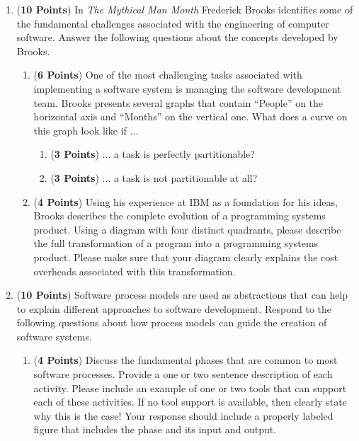\documentclass[12pt,epsf,psfig,graphics]{article}
\begin{document}
\begin{enumerate}
  
\item ({\bf 10 Points}) In {\em The Mythical Man Month} Frederick
  Brooks identifies some of the fundamental challenges associated with
  the engineering of computer software.  Answer the following
  questions about the concepts developed by Brooks.

  \begin{enumerate}
          
  \item ({\bf 6 Points}) One of the most challenging tasks associated
    with implementing a software system is managing the software
    development team.  Brooks presents several graphs that contain
    ``People'' on the horizontal axis and ``Months'' on the vertical
    one.  What does a curve on this graph look like if $\ldots$

    \begin{enumerate}

      \item ({\bf 3 Points}) $\ldots$ a task is perfectly partitionable?
    
      \item ({\bf 3 Points}) $\ldots$ a task is not partitionable at all?

    \end{enumerate}

  \item ({\bf 4 Points}) Using his experience at IBM as a foundation
    for his ideas, Brooks describes the complete evolution of a
    programming systems product.  Using a diagram with four distinct
    quadrants, please describe the full transformation of a program
    into a programming systems product.  Please make sure that your
    diagram clearly explains the cost overheads associated with this
    transformation.

  \end{enumerate}
        
\newpage

\item ({\bf 10 Points}) Software process models are used as
  abstractions that can help to explain different approaches to
  software development. Respond to the following questions about how
  process models can guide the creation of software systems.

        \begin{enumerate}
          
        \item ({\bf 4 Points}) Discuss the fundamental phases that
          are common to most software processes.  Provide a one or two
          sentence description of each activity.  Please include an
          example of one or two tools that can support each of these
          activities. If no tool support is available, then clearly
          state why this is the case!  Your response should include a
          properly labeled figure that includes the phase and its
          input and output.
          

\end{enumerate}
\end{enumerate}
\end{document}
